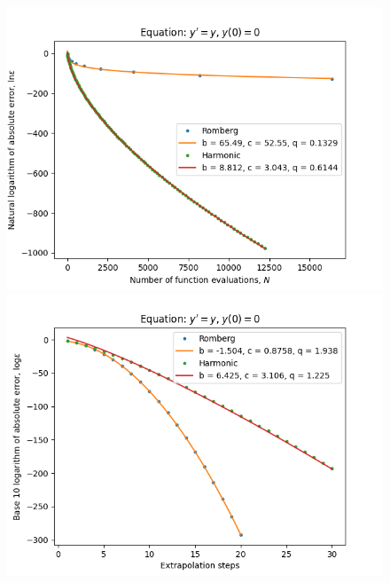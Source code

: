 \begin{figure}[H]
\centering
\begin{minipage}{0.45\textwidth}
\centering
\includegraphics[scale=0.45]{emr_plots/exp_growth_hp_trend.png}
\end{minipage}
\begin{minipage}{0.45\textwidth}
\centering
\includegraphics[scale=0.45]{emr_plots/exp_growth_hp_steps.png}
\end{minipage}
\end{figure}

